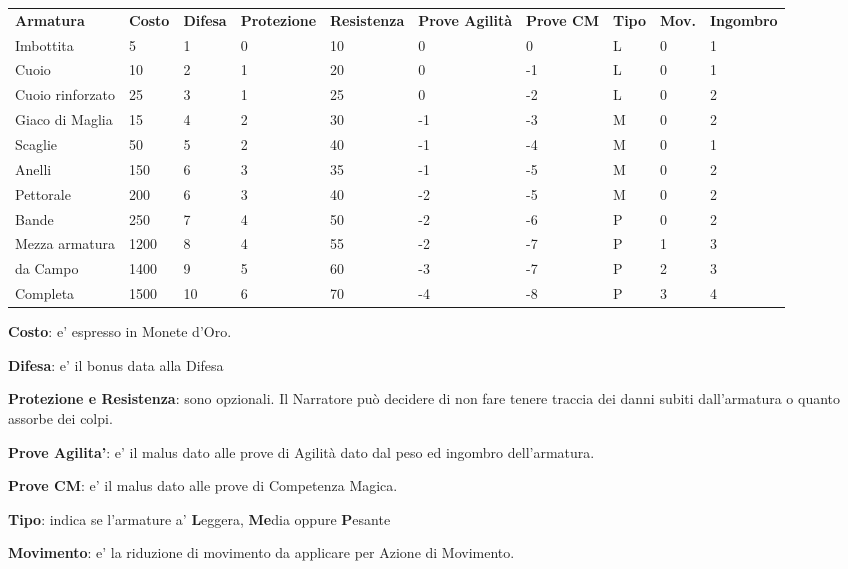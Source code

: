 \documentclass[a4paper,11pt,twoside,openany]{book}
\begin{document}
\label{tabella-armature}
\begin{tabularx}{0.95\textwidth}{lXXllXXXXX}
	\toprule
	\textbf{Armatura} & \textbf{Costo} & \textbf{Difesa} & \textbf{Protezione} & \textbf{Resistenza} & \textbf{Prove Agilità} & \textbf{Prove CM} & \textbf{Tipo} & \textbf{Mov.} & \textbf{Ingombro}\\
	Imbottita    & 5    & 1& 0 & 10   & 0   & 0  & L   & 0   & 1\\
	Cuoio   & 10   & 2& 1 & 20   & 0   & -1 & L   & 0   & 1\\
	Cuoio rinforzato  & 25   & 3& 1 & 25   & 0   & -2 & L   & 0   & 2\\
	Giaco di Maglia   & 15   & 4& 2 & 30   & -1  & -3 & M   & 0   & 2\\
	Scaglie & 50   & 5& 2 & 40   & -1  & -4 & M   & 0   & 1\\
	Anelli  & 150  & 6& 3 & 35   & -1  & -5 & M   & 0   & 2\\
	Pettorale    & 200  & 6& 3 & 40   & -2  & -5 & M   & 0   & 2\\
	Bande   & 250  & 7& 4 & 50   & -2  & -6 & P   & 0   & 2\\
	Mezza armatura    & 1200 & 8& 4 & 55   & -2  & -7 & P   & 1   & 3\\
	da Campo& 1400 & 9& 5 & 60   & -3  & -7 & P   & 2   & 3\\
	Completa& 1500 & 10    & 6 & 70   & -4  & -8 & P   & 3   & 4\\
\end{tabularx}

\smallskip

\textbf{Costo}: e' espresso in Monete d'Oro.

\textbf{Difesa}: e' il bonus data alla Difesa

\textbf{Protezione e Resistenza}: sono opzionali. Il Narratore può decidere di non fare tenere traccia dei danni subiti dall'armatura o quanto assorbe dei colpi.

\textbf{Prove Agilita'}: e' il malus dato alle prove di Agilità dato dal peso ed ingombro dell'armatura.

\textbf{Prove CM}: e' il malus dato alle prove di Competenza Magica.

\textbf{Tipo}: indica se l'armature a' \textbf{L}eggera, \textbf{Me}dia oppure \textbf{P}esante

\textbf{Movimento}: e' la riduzione di movimento da applicare per Azione di Movimento.
\end{document}

